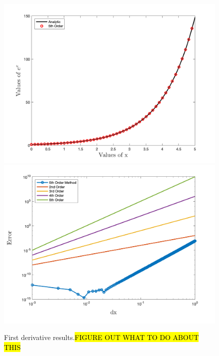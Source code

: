 \begin{figure}
	\begin{multicols}{2}
		\includegraphics[width=1.1\columnwidth]{figs/1stDer.png}
		\label{fig:1stDer} 
		\includegraphics[width=1.1\columnwidth]{figs/1stErr.png}
		\label{fig:1stDer} 
	\end{multicols}
	\caption{First derivative results.\hl{FIGURE OUT WHAT TO DO ABOUT THIS}}
\end{figure}

